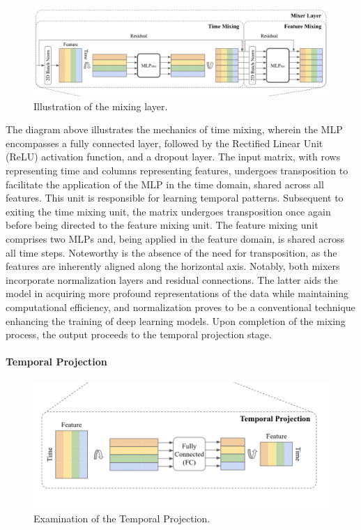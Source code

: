 \begin{figure}
    \centering
    \includegraphics[width=1\linewidth]{images/model architectures/Mixing layer.png}
    \caption{Illustration of the mixing layer. \cite{chen2023tsmixer}}
    \label{fig:tsmixer-mixing-layer}
\end{figure}

The diagram above illustrates the mechanics of time mixing, wherein the MLP encompasses a fully connected layer, followed by the Rectified Linear Unit (ReLU) activation function, and a dropout layer. The input matrix, with rows representing time and columns representing features, undergoes transposition to facilitate the application of the MLP in the time domain, shared across all features. This unit is responsible for learning temporal patterns. Subsequent to exiting the time mixing unit, the matrix undergoes transposition once again before being directed to the feature mixing unit. The feature mixing unit comprises two MLPs and, being applied in the feature domain, is shared across all time steps. Noteworthy is the absence of the need for transposition, as the features are inherently aligned along the horizontal axis. Notably, both mixers incorporate normalization layers and residual connections. The latter aids the model in acquiring more profound representations of the data while maintaining computational efficiency, and normalization proves to be a conventional technique enhancing the training of deep learning models. Upon completion of the mixing process, the output proceeds to the temporal projection stage.

\paragraph{Temporal Projection}

\begin{figure}
    \centering
    \includegraphics[width=1\linewidth]{images/model architectures/temporalprojection.png}
    \caption{Examination of the Temporal Projection. \cite{chen2023tsmixer}}
    \label{fig:enter-label}
\end{figure}

